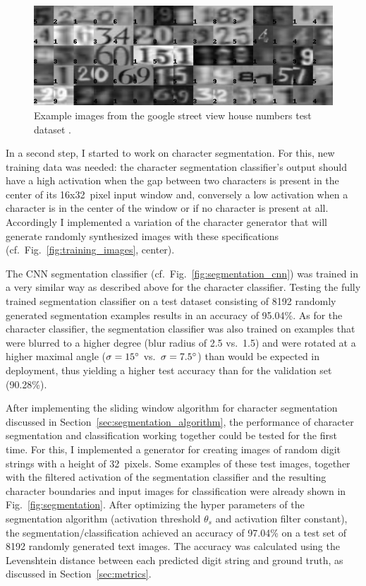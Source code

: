 \documentclass[12pt]{article}
\newcommand\figref[1]{Fig.~\ref{fig:#1}}
\newcommand\secref[1]{Section~\ref{sec:#1}}
\begin{document}
\begin{figure}
  \centering
  \includegraphics[width=1.0\linewidth]{fig/svhn_test}
  \caption
  {
    Example images from the google street view house numbers test dataset \cite{Netzer2011,TheStree9:online}.
  }
  \label{fig:svhn_data}
\end{figure}

In a second step, I started to work on character segmentation. For this, new training
data was needed: the character segmentation classifier's output should have a high
activation when the gap between two characters is present in the center of its
16x32~pixel input window and, conversely a low activation when a character is in the
center of the window or if no character is present at all.
Accordingly I implemented a variation of the character generator that will generate
randomly synthesized images with these specifications (cf.~\figref{training_images}, center).

The CNN segmentation classifier (cf.~\figref{segmentation_cnn}) was trained in a very similar way as described above for the
character classifier. Testing the fully trained segmentation classifier on a test dataset consisting
of 8192 randomly generated segmentation examples results in an accuracy of 95.04\%.
As for the character classifier, the segmentation classifier was also trained on examples
that were blurred to a higher degree (blur radius of 2.5 vs.\ 1.5) and were rotated at a higher
maximal angle ($\sigma=15\degree$ vs.\ $\sigma=7.5\degree$) than would be expected in deployment, thus
yielding a higher test accuracy than for the validation set (90.28\%).

After implementing the sliding window algorithm for character segmentation discussed in
\secref{segmentation_algorithm}, the performance of character segmentation and classification
working together could be tested for the first time. For this, I implemented a generator
for creating images of random digit strings with a height of 32~pixels.
Some examples of these test images, together with the filtered activation of the
segmentation classifier and the resulting
character boundaries and input images for classification were already shown in
\figref{segmentation}. After optimizing the hyper parameters of the segmentation algorithm
(activation threshold $\theta_s$ and activation filter constant), the segmentation/classification
achieved an accuracy of 97.04\% on a test set of 8192 randomly generated text images.
The accuracy was calculated using the Levenshtein distance between each predicted digit
string and ground truth, as discussed in \secref{metrics}.
\end{document}
